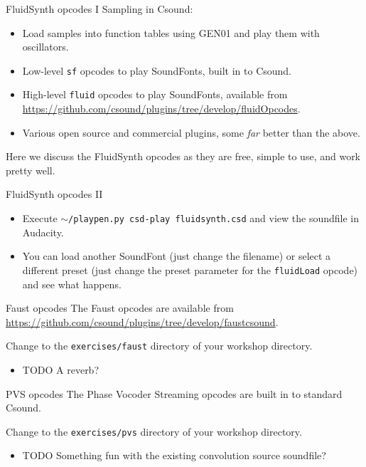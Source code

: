 \documentclass{beamer}
\begin{document}
\begin{frame}{FluidSynth opcodes I}
Sampling in Csound:
\begin{itemize}
\item Load samples into function tables using GEN01 and play them with oscillators.
\item Low-level \texttt{sf} opcodes to play SoundFonts, built in to Csound.
\item High-level \texttt{fluid} opcodes to play SoundFonts, available from \url{https://github.com/csound/plugins/tree/develop/fluidOpcodes}.
\item Various open source and commercial plugins, some \emph{far} better than the above.
\end{itemize}
Here we discuss the FluidSynth opcodes as they are free,  simple to use, and work pretty well. 
\end{frame}

\begin{frame}{FluidSynth opcodes II}
\begin{example}
\begin{itemize}
\item Execute \texttt{$\sim$/playpen.py csd-play fluidsynth.csd} and view the soundfile in Audacity.
\item You can load another SoundFont (just change the filename) or select a different preset (just change the preset parameter for the \texttt{fluidLoad} opcode) and see what happens.
\end{itemize}
\end{example}
\end{frame}

\begin{frame}{Faust opcodes}
The Faust opcodes are available from \url{https://github.com/csound/plugins/tree/develop/faustcsound}.
\begin{example}
Change to the \texttt{exercises/faust} directory of your workshop directory.
\begin{itemize}
\item TODO A reverb?
\end{itemize}
\end{example}
\end{frame}

\begin{frame}{PVS opcodes}
The Phase Vocoder Streaming opcodes are built in to standard Csound.
\begin{example}
Change to the \texttt{exercises/pvs} directory of your workshop directory.
\begin{itemize}
\item TODO Something fun with the existing convolution source soundfile?
\end{itemize}
\end{example}
\end{frame}
\end{document}
